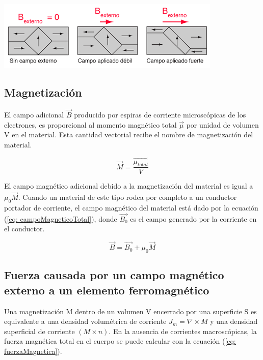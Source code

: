 \documentclass[a4paper,12pt]{article}
\newenvironment{Figure}
    {\par\medskip\noindent\minipage{\linewidth}}
    {\endminipage\par\medskip}
\begin{document}
        \begin{Figure}
            \centering
            \includegraphics[width=0.6\linewidth]{ferromagnetismo_campoMagneticoAplicado.png}
            \label{fig: ferromagnetismo_campoMagneticoAplicado}
        \end{Figure}

    \subsection*{Magnetización}

        El campo adicional $\vec{B}$ producido por espiras de corriente microscópicas de los electrones, es proporcional al momento magnético total $\vec{\mu}$ por unidad de volumen V en el material. Esta cantidad vectorial recibe el nombre de magnetización del material.

        \begin{equation}
            \label{eq: magnetizacion}
            \vec{M} = \frac{\vec{\mu_{total}}}{V}
        \end{equation}

        El campo magnético adicional debido a la magnetización del material es igual a $\mu_0 \vec{M}$. Cuando un material de este tipo rodea por completo a un conductor portador de corriente, el campo magnético del material está dado por la ecuación (\ref{eq: campoMagneticoTotal}), donde $\vec{B_0}$ es el campo generado por la corriente en el conductor.

        \begin{equation}
            \label{eq: campoMagneticoTotal}
            \vec{B} = \vec{B_0} + \mu_0 \vec{M}
        \end{equation}

    \subsection*{Fuerza causada por un campo magnético externo a un elemento ferromagnético}

        Una magnetización M dentro de un volumen V encerrado por una superficie S es equivalente a una densidad volumétrica de corriente $J_m = \nabla \times M$ y una densidad superficial de corriente $(M \times n)$. En la ausencia de corrientes macroscópicas, la fuerza magnética total en el cuerpo se puede calcular con la ecuación (\ref{eq: fuerzaMagnetica}). \cite{Jackson}
\end{document}
